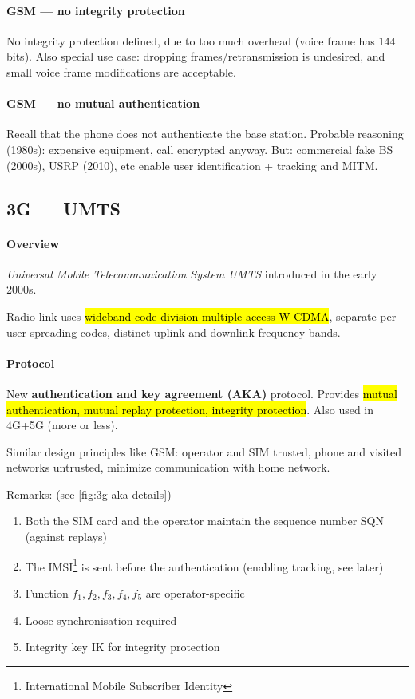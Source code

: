 \paragraph{GSM --- no integrity protection}
No integrity protection defined, due to too much overhead (voice frame has 144
bits). Also special use case: dropping frames/retransmission is undesired, and
small voice frame modifications are acceptable.

\paragraph{GSM --- no mutual authentication}
Recall that the phone does not authenticate the base station. Probable
reasoning (1980s): expensive equipment, call encrypted anyway. But: commercial
fake BS (2000s), USRP (2010), etc enable user identification + tracking and
MITM.

\subsection{3G --- UMTS}

\paragraph{Overview}
\textit{Universal Mobile Telecommunication System UMTS} introduced in the early 2000s.

Radio link uses \hl{wideband code-division multiple access W-CDMA},
separate per-user spreading codes, distinct uplink and downlink frequency
bands.

\paragraph{Protocol}
New \textbf{authentication and key agreement (AKA)} protocol. Provides \hl{mutual
	authentication, mutual replay protection, integrity protection}. Also used in
4G+5G (more or less).

Similar design principles like GSM: operator and SIM trusted, phone and visited
networks untrusted, minimize communication with home network.

\underline{Remarks:} (see \autoref{fig:3g-aka-details})
\begin{enumerate}
	\item Both the SIM card and the operator maintain the sequence number SQN (against
	      replays)
	\item The IMSI\footnote{International Mobile Subscriber Identity} is sent before the
	      authentication (enabling tracking, see later)
	\item Function $f_1, f_2, f_3, f_4, f_5$ are operator-specific
	\item Loose synchronisation required
	\item Integrity key IK for integrity protection
\end{enumerate}

